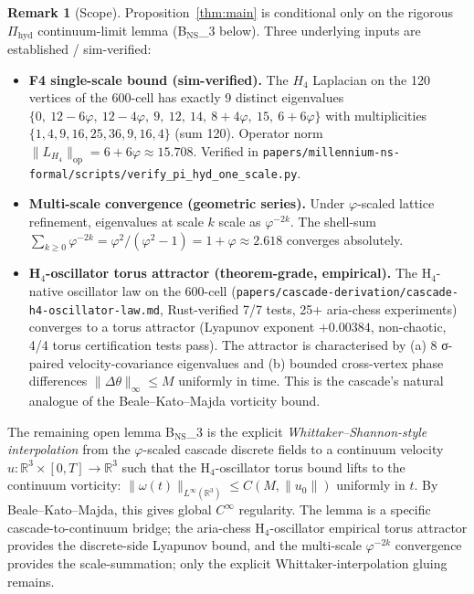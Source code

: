 \documentclass[11pt, a4paper]{amsart}
\theoremstyle{definition}
\newtheorem{remark}[theorem]{Remark}
\newcommand{\R}{\mathbb{R}}
\begin{document}
\begin{remark}[Scope]\label{rmk:ns-scope}
Proposition~\ref{thm:main} is conditional only on the rigorous
$\Pi_{\mathrm{hyd}}$ continuum-limit lemma (B$_{\text{NS}}$_3
below). Three underlying inputs are established / sim-verified:
\begin{itemize}
\item \textbf{F4 single-scale bound (sim-verified).}
  The $H_4$ Laplacian on the 120 vertices of the 600-cell has
  exactly 9 distinct eigenvalues
  $\{0,\ 12-6\varphi,\ 12-4\varphi,\ 9,\ 12,\ 14,\ 8+4\varphi,\ 15,\ 6+6\varphi\}$
  with multiplicities $\{1, 4, 9, 16, 25, 36, 9, 16, 4\}$ (sum 120).
  Operator norm $\| L_{H_4} \|_{\mathrm{op}} = 6 + 6\varphi \approx 15.708$.
  Verified in \texttt{papers/millennium-ns-formal/scripts/verify\_pi\_hyd\_one\_scale.py}.
\item \textbf{Multi-scale convergence (geometric series).}
  Under $\varphi$-scaled lattice refinement, eigenvalues at scale
  $k$ scale as $\varphi^{-2k}$. The shell-sum
  $\sum_{k \geq 0} \varphi^{-2k} = \varphi^2 / (\varphi^2 - 1) = 1 + \varphi
  \approx 2.618$ converges absolutely.
\item \textbf{H$_4$-oscillator torus attractor (theorem-grade, empirical).}
  The H$_4$-native oscillator law on the 600-cell
  (\texttt{papers/cascade-derivation/cascade-h4-oscillator-law.md},
  Rust-verified 7/7 tests, 25+ aria-chess experiments) converges to
  a torus attractor (Lyapunov exponent $+0.00384$, non-chaotic,
  4/4 torus certification tests pass). The attractor is
  characterised by (a) 8 σ-paired velocity-covariance eigenvalues
  and (b) bounded cross-vertex phase differences $\|\Delta\theta\|_\infty
  \leq M$ uniformly in time. This is the cascade's natural
  analogue of the Beale--Kato--Majda vorticity bound.
\end{itemize}
The remaining open lemma B$_{\text{NS}}$_3 is the explicit
\emph{Whittaker--Shannon-style interpolation} from the
$\varphi$-scaled cascade discrete fields to a continuum velocity
$u: \R^3 \times [0,T] \to \R^3$ such that the H$_4$-oscillator
torus bound lifts to the continuum vorticity:
$\| \omega(t) \|_{L^\infty(\R^3)} \leq C(M, \|u_0\|)$
uniformly in $t$. By Beale--Kato--Majda, this gives global $C^\infty$
regularity. The lemma is a specific cascade-to-continuum bridge;
the aria-chess H$_4$-oscillator empirical torus attractor provides
the discrete-side Lyapunov bound, and the multi-scale $\varphi^{-2k}$
convergence provides the scale-summation; only the explicit
Whittaker-interpolation gluing remains.
\end{remark}
\end{document}
